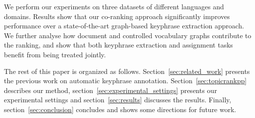   We perform our experiments on three datasets of different languages and domains.
  Results show that our co-ranking approach significantly improves performance over a state-of-the-art graph-based keyphrase extraction approach.
  We further analyse how document and controlled vocabulary graphs contribute to the ranking, and show that both keyphrase extraction and assignment tasks benefit from being treated jointly.
  


  The rest of this paper is organized as follows. Section~\ref{sec:related_work}
  presents the previous work on automatic keyphrase annotation.
  Section~\ref{sec:topicrankpp} describes our method,
  section~\ref{sec:experimental_settings} presents our experimental settings and
  section~\ref{sec:results} discusses the results.
  Finally, section~\ref{sec:conclusion} concludes and shows some directions 
  for future work.

